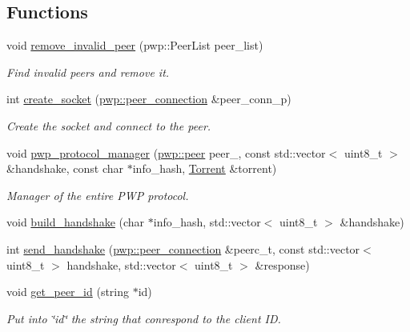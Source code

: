 \subsection*{Functions}
\begin{DoxyCompactItemize}
\item 
void \hyperlink{namespacepwp_ae8331eb5e3c98deddc6022dad92352f6}{remove\+\_\+invalid\+\_\+peer} (pwp\+::\+Peer\+List peer\+\_\+list)
\begin{DoxyCompactList}\small\item\em Find invalid peers and remove it. \end{DoxyCompactList}\item 
int \hyperlink{namespacepwp_a73acf05b954e39825a88036d5793db6b}{create\+\_\+socket} (\hyperlink{structpwp_1_1peer__connection}{pwp\+::peer\+\_\+connection} \&peer\+\_\+conn\+\_\+p)
\begin{DoxyCompactList}\small\item\em Create the socket and connect to the peer. \end{DoxyCompactList}\item 
void \hyperlink{namespacepwp_a62060bdcdc80541b0892e26fbeab1e91}{pwp\+\_\+protocol\+\_\+manager} (\hyperlink{structpwp_1_1peer}{pwp\+::peer} peer\+\_\+, const std\+::vector$<$ uint8\+\_\+t $>$ \&handshake, const char $\ast$info\+\_\+hash, \hyperlink{structtorr_1_1Torrent}{Torrent} \&torrent)
\begin{DoxyCompactList}\small\item\em Manager of the entire P\+WP protocol. \end{DoxyCompactList}\item 
void \hyperlink{namespacepwp_a6062876f4d4d4d6ee19341a79a797864}{build\+\_\+handshake} (char $\ast$info\+\_\+hash, std\+::vector$<$ uint8\+\_\+t $>$ \&handshake)
\item 
int \hyperlink{namespacepwp_a851ddc0e8fb2eb0a86317cc944c4a927}{send\+\_\+handshake} (\hyperlink{structpwp_1_1peer__connection}{pwp\+::peer\+\_\+connection} \&peerc\+\_\+t, const std\+::vector$<$ uint8\+\_\+t $>$ handshake, std\+::vector$<$ uint8\+\_\+t $>$ \&response)
\item 
void \hyperlink{namespacepwp_ada6a8613896dbbfd6fba63b17d51684c}{get\+\_\+peer\+\_\+id} (string $\ast$id)
\begin{DoxyCompactList}\small\item\em Put into \char`\"{}id\char`\"{} the string that conrespond to the client ID. \end{DoxyCompactList}\item 

\end{DoxyCompactItemize}
